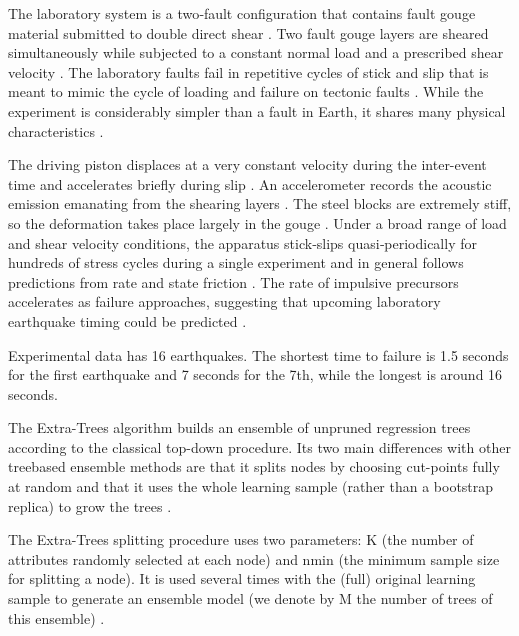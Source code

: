 \documentclass[]{llncs} %
\begin{document}
The laboratory system is a two‐fault configuration that contains fault gouge material submitted to double direct shear \cite{kaggle}.
Two fault gouge layers are sheared simultaneously while subjected to a constant normal load and a prescribed shear velocity \cite{kaggle}. The laboratory faults fail in repetitive cycles of stick and slip that is meant to mimic the cycle of loading and failure on tectonic faults \cite{kaggle}. While the experiment is considerably simpler than a fault in Earth, it shares many physical characteristics \cite{kaggle}. \par

The driving piston displaces at a very constant velocity during the inter-event time and accelerates briefly during slip \cite{Bertrand}. An accelerometer records the acoustic emission emanating from the shearing layers \cite{Bertrand}. The steel blocks are extremely stiff, so the deformation takes place largely in the gouge \cite{Bertrand}. Under a broad range of load and shear velocity conditions, the apparatus stick‐slips quasi‐periodically for hundreds of stress cycles during a single experiment and in general follows predictions from rate and state friction \cite{Bertrand}. The rate of impulsive precursors accelerates as failure approaches, suggesting that upcoming laboratory earthquake timing could be predicted \cite{Bertrand}. \par

Experimental data has 16 earthquakes. The shortest time to failure is 1.5 seconds for the first earthquake and 7 seconds for the 7th, while the longest is around 16 seconds. \par

The Extra-Trees algorithm builds an ensemble of unpruned regression trees according to the classical top-down procedure. Its two main differences with other treebased ensemble methods are that it splits nodes by choosing cut-points fully at random and that it uses the whole learning sample (rather than a bootstrap replica) to grow the trees \cite{ExtremeRandomTrees}. \par

The Extra-Trees splitting procedure uses two parameters: K (the number of attributes randomly selected at each node) and nmin (the minimum sample size for splitting a node). It is used several times with the (full) original learning sample to generate an ensemble model (we denote by M the number of trees of this ensemble) \cite{ExtremeRandomTrees}. 
\end{document}
